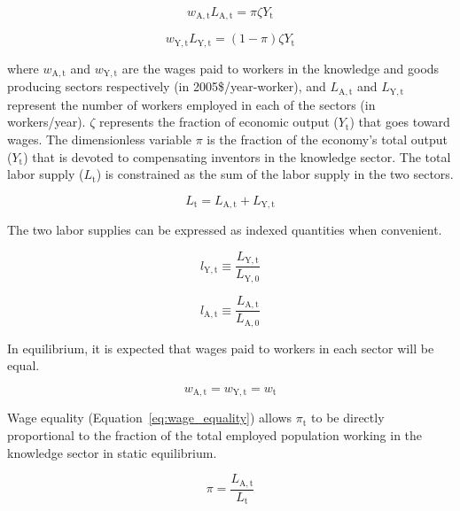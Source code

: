 \documentclass[letterpaper,12pt]{article}
\begin{document}
\begin{equation} \label{eq:knowledge_comp}
	w_\mathrm{A,t} L_\mathrm{A,t} = \pi \zeta Y_\mathrm{t}
\end{equation}

\begin{equation} \label{eq:labor_comp}
	w_\mathrm{Y,t} L_\mathrm{Y,t} = (1-\pi) \zeta Y_\mathrm{t}
\end{equation}

\noindent where $w_\mathrm{A,t}$ and $w_\mathrm{Y,t}$ are the wages paid to workers in the knowledge and goods producing sectors respectively (in 2005\$/year-worker), and $L_\mathrm{A,t}$ and $L_\mathrm{Y,t}$ represent the number of workers employed in each of the sectors (in workers/year). $\zeta$ represents the fraction of economic output ($Y_\mathrm{t}$) that goes toward wages. The dimensionless variable $\pi$ is the fraction of the economy's total output ($Y_\mathrm{t}$) that is devoted to compensating inventors in the knowledge sector. The total labor supply ($L_\mathrm{t}$) is constrained as the sum of the labor supply in the two sectors.

\begin{equation} \label{eq:labor_supply}
	L_\mathrm{t} = L_\mathrm{A,t} + L_\mathrm{Y,t}
\end{equation}

The two labor supplies can be expressed as indexed quantities when convenient.

\begin{equation} \label{eq:Y_wage}
	l_\mathrm{Y,t} \equiv \frac{L_\mathrm{Y,t}}{L_\mathrm{Y,0}}
\end{equation}

\begin{equation} \label{eq:A_wage}
	l_\mathrm{A,t} \equiv \frac{L_\mathrm{A,t}}{L_\mathrm{A,0}}
\end{equation}

In equilibrium, it is expected that wages paid to workers in each sector will be equal.

\begin{equation} \label{eq:wage_equality}
	w_\mathrm{A,t} = w_\mathrm{Y,t} = w_\mathrm{t}
\end{equation}

Wage equality (Equation~\ref{eq:wage_equality}) allows $\pi_\mathrm{t}$ to be directly proportional to the fraction of the total employed population working in the knowledge sector in static equilibrium.

\begin{equation} \label{eq:pi}
	\pi = \frac{L_\mathrm{A,t}}{L_\mathrm{t}}
\end{equation}
\end{document}
